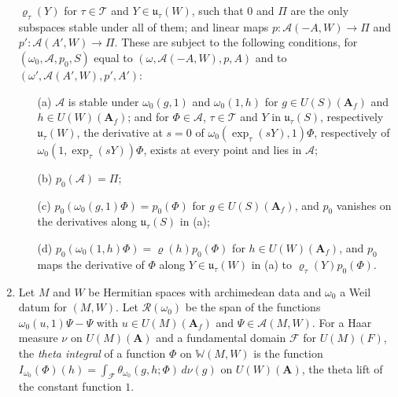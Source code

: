 \begin{definition}
\begin{enumerate}
  $\varrho_\tau(Y)$ for $\tau\in\mathcal T$ and $Y\in\mathfrak u_\tau(W)$, such
  that $0$ and $\Pi$ are the only subspaces stable under all of them; and
  linear maps $p\colon\mathcal A(-A,W)\to\Pi$ and
  $p'\colon\mathcal A(A',W)\to\Pi$. These are subject to the following
  conditions, for $(\omega_0,\mathcal A,p_0,S)$ equal to
  $(\omega,\mathcal A(-A,W),p,A)$ and to $(\omega',\mathcal A(A',W),p',A')$:
  \begin{enumerate}
  \item[(a)] $\mathcal A$ is stable under $\omega_0(g,1)$ and $\omega_0(1,h)$
    for $g\in U(S)(\mathbf A_f)$ and $h\in U(W)(\mathbf A_f)$; and for
    $\Phi\in\mathcal A$, $\tau\in\mathcal T$ and $Y$ in $\mathfrak u_\tau(S)$,
    respectively $\mathfrak u_\tau(W)$, the derivative at $s=0$ of
    $\omega_0(\exp_\tau(sY),1)\Phi$, respectively of
    $\omega_0(1,\exp_\tau(sY))\Phi$, exists at every point and lies in
    $\mathcal A$;
  \item[(b)] $p_0(\mathcal A)=\Pi$;
  \item[(c)] $p_0(\omega_0(g,1)\Phi)=p_0(\Phi)$ for $g\in U(S)(\mathbf A_f)$,
    and $p_0$ vanishes on the derivatives along $\mathfrak u_\tau(S)$ in (a);
  \item[(d)] $p_0(\omega_0(1,h)\Phi)=\varrho(h)p_0(\Phi)$ for
    $h\in U(W)(\mathbf A_f)$, and $p_0$ maps the derivative of $\Phi$ along
    $Y\in\mathfrak u_\tau(W)$ in (a) to $\varrho_\tau(Y)p_0(\Phi)$.
  \end{enumerate}
\item Let $M$ and $W$ be Hermitian spaces with archimedean data and $\omega_0$
  a Weil datum for $(M,W)$. Let $\mathcal R(\omega_0)$ be the span of the
  functions $\omega_0(u,1)\Psi-\Psi$ with $u\in U(M)(\mathbf A_f)$ and
  $\Psi\in\mathcal A(M,W)$. For a Haar measure $\nu$ on $U(M)(\mathbf A)$ and a
  fundamental domain $\mathcal F$ for $U(M)(F)$, the \emph{theta integral} of a
  function $\Phi$ on $\mathbb W(M,W)$ is the function
  $I_{\omega_0}(\Phi)(h)=\int_{\mathcal F}\theta_{\omega_0}(g,h;\Phi)\,d\nu(g)$
  on $U(W)(\mathbf A)$, the theta lift of the constant function $1$.
\end{enumerate}
\end{definition}

